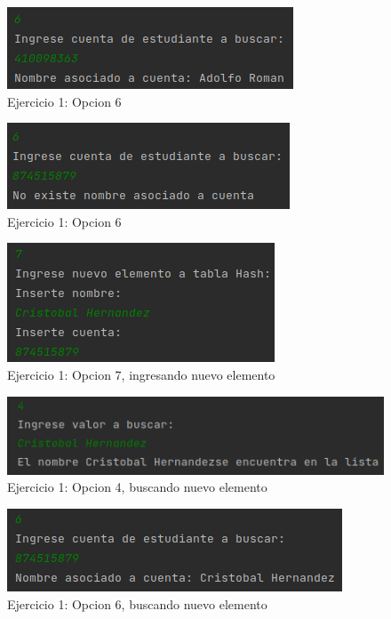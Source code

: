 \documentclass{article}
\begin{document}
			\begin{figure}[H]
				\centering
				\includegraphics{images/e19.png}
				\caption*{Ejercicio 1: Opcion 6}
			\end{figure}
			
			\begin{figure}[H]
				\centering
				\includegraphics{images/e110.png}
				\caption*{Ejercicio 1: Opcion 6}
			\end{figure}
			
			\begin{figure}[H]
				\centering
				\includegraphics{images/e111.png}
				\caption*{Ejercicio 1: Opcion 7, ingresando nuevo elemento}
			\end{figure}
			
			\begin{figure}[H]
				\centering
				\includegraphics{images/e112.png}
				\caption*{Ejercicio 1: Opcion 4, buscando nuevo elemento}
			\end{figure}
			
			\begin{figure}[H]
				\centering
				\includegraphics{images/e113.png}
				\caption*{Ejercicio 1: Opcion 6, buscando nuevo elemento}
			\end{figure}
			
\end{document}
